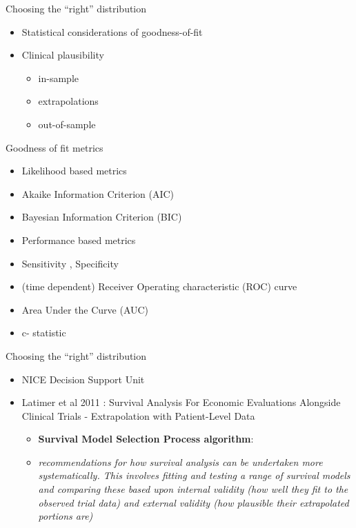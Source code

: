 \documentclass[ignorenonframetext,]{beamer}
\providecommand{\tightlist}{%
  \setlength{\itemsep}{0pt}\setlength{\parskip}{0pt}}
\begin{document}
\begin{frame}{Choosing the ``right'' distribution}

\begin{itemize}
\tightlist
\item
  Statistical considerations of goodness-of-fit
\item
  Clinical plausibility

  \begin{itemize}
  \tightlist
  \item
    in-sample
  \item
    extrapolations
  \item
    out-of-sample
  \end{itemize}
\end{itemize}

\end{frame}

\begin{frame}{Goodness of fit metrics}

\begin{itemize}
\item
  Likelihood based metrics
\item
  Akaike Information Criterion (AIC)
\item
  Bayesian Information Criterion (BIC)
\item
  Performance based metrics
\item
  Sensitivity , Specificity
\item
  (time dependent) Receiver Operating characteristic (ROC) curve
\item
  Area Under the Curve (AUC)
\item
  c- statistic
\end{itemize}

\end{frame}

\begin{frame}{Choosing the ``right'' distribution}

\begin{itemize}
\tightlist
\item
  NICE Decision Support Unit
\item
  Latimer et al 2011 : Survival Analysis For Economic Evaluations
  Alongside Clinical Trials - Extrapolation with Patient-Level Data

  \begin{itemize}
  \tightlist
  \item
    \textbf{Survival Model Selection Process algorithm}:
  \item
    \emph{recommendations for how survival analysis can be undertaken
    more systematically. This involves fitting and testing a range of
    survival models and comparing these based upon internal validity
    (how well they fit to the observed trial data) and external validity
    (how plausible their extrapolated portions are)}
  \end{itemize}
\end{itemize}

\end{frame}
\end{document}
